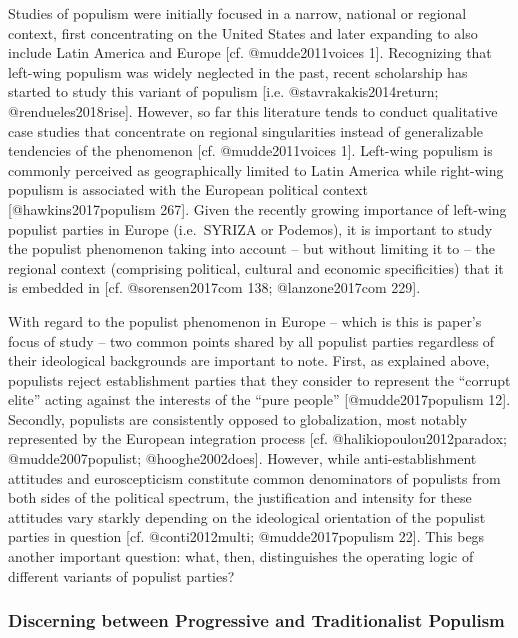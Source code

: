 \documentclass[]{article}
\begin{document}
Studies of populism were initially focused in a narrow, national or
regional context, first concentrating on the United States and later
expanding to also include Latin America and Europe {[}cf.
@mudde2011voices 1{]}. Recognizing that left-wing populism was widely
neglected in the past, recent scholarship has started to study this
variant of populism {[}i.e. @stavrakakis2014return;
@rendueles2018rise{]}. However, so far this literature tends to conduct
qualitative case studies that concentrate on regional singularities
instead of generalizable tendencies of the phenomenon {[}cf.
@mudde2011voices 1{]}. Left-wing populism is commonly perceived as
geographically limited to Latin America while right-wing populism is
associated with the European political context {[}@hawkins2017populism
267{]}. Given the recently growing importance of left-wing populist
parties in Europe (i.e.~SYRIZA or Podemos), it is important to study the
populist phenomenon taking into account -- but without limiting it to --
the regional context (comprising political, cultural and economic
specificities) that it is embedded in {[}cf. @sorensen2017com 138;
@lanzone2017com 229{]}.

With regard to the populist phenomenon in Europe -- which is this is
paper's focus of study -- two common points shared by all populist
parties regardless of their ideological backgrounds are important to
note. First, as explained above, populists reject establishment parties
that they consider to represent the ``corrupt elite'' acting against the
interests of the ``pure people'' {[}@mudde2017populism 12{]}. Secondly,
populists are consistently opposed to globalization, most notably
represented by the European integration process {[}cf.
@halikiopoulou2012paradox; @mudde2007populist; @hooghe2002does{]}.
However, while anti-establishment attitudes and euroscepticism
constitute common denominators of populists from both sides of the
political spectrum, the justification and intensity for these attitudes
vary starkly depending on the ideological orientation of the populist
parties in question {[}cf. @conti2012multi; @mudde2017populism 22{]}.
This begs another important question: what, then, distinguishes the
operating logic of different variants of populist parties?

\subsubsection{Discerning between Progressive and Traditionalist
Populism}\label{discerning-between-progressive-and-traditionalist-populism}
\end{document}
